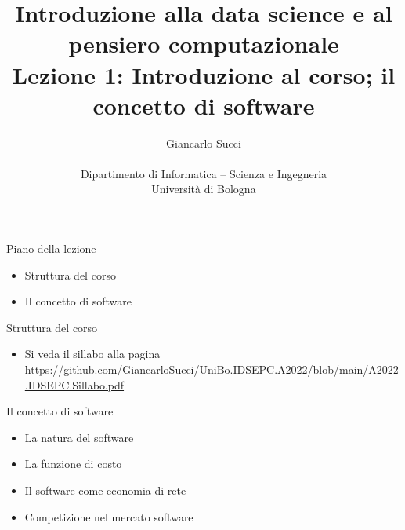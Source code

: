 \documentclass{beamer}
\title[L01]{Introduzione alla data science e al pensiero computazionale\\
Lezione 1: Introduzione al corso; il concetto di software} %
\author[{\tiny Giancarlo Succi }]{Giancarlo Succi\\\\ Dipartimento di Informatica -- Scienza e Ingegneria\\Universit\`{a} di Bologna\\
\bftt{g.succi@unibo.it}
} %
\institute[unibo] %
\date{} %
\begin{document}
\begin{frame}
\titlepage %

\end{frame}




\begin{frame}
{\centerline{Piano della lezione}}
\begin{itemize}
    \item Struttura del corso
    \item Il concetto di software
\end{itemize} 
\end{frame}

\begin{frame}
{\centerline{Struttura del corso}}
\begin{itemize}
    \item Si veda il sillabo alla pagina \url{https://github.com/GiancarloSucci/UniBo.IDSEPC.A2022/blob/main/A2022.IDSEPC.Sillabo.pdf}
\end{itemize} 
\end{frame}


\begin{frame}
{\centerline{Il concetto di software}}
\begin{itemize}
    \item La natura del software
    \item La funzione di costo
    \item Il software come economia di rete 
    \item Competizione nel mercato software
\end{itemize} 
\end{frame}
\end{document}
